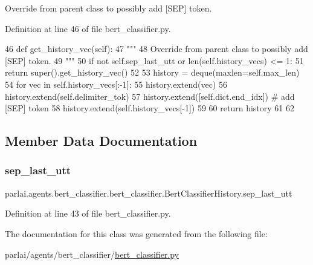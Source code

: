 \begin{DoxyVerb}Override from parent class to possibly add [SEP] token.
\end{DoxyVerb}
 

Definition at line 46 of file bert\+\_\+classifier.\+py.


\begin{DoxyCode}
46     \textcolor{keyword}{def }get\_history\_vec(self):
47         \textcolor{stringliteral}{"""}
48 \textcolor{stringliteral}{        Override from parent class to possibly add [SEP] token.}
49 \textcolor{stringliteral}{        """}
50         \textcolor{keywordflow}{if} \textcolor{keywordflow}{not} self.sep\_last\_utt \textcolor{keywordflow}{or} len(self.history\_vecs) <= 1:
51             \textcolor{keywordflow}{return} super().get\_history\_vec()
52 
53         history = deque(maxlen=self.max\_len)
54         \textcolor{keywordflow}{for} vec \textcolor{keywordflow}{in} self.history\_vecs[:-1]:
55             history.extend(vec)
56             history.extend(self.delimiter\_tok)
57         history.extend([self.dict.end\_idx])  \textcolor{comment}{# add [SEP] token}
58         history.extend(self.history\_vecs[-1])
59 
60         \textcolor{keywordflow}{return} history
61 
62 
\end{DoxyCode}


\subsection{Member Data Documentation}
\mbox{\label{classparlai_1_1agents_1_1bert__classifier_1_1bert__classifier_1_1BertClassifierHistory_ab53ecd52f1f23b1ea488637cc8fd8068}} 
\subsubsection{\texorpdfstring{sep\+\_\+last\+\_\+utt}{sep\_last\_utt}}
{\footnotesize\ttfamily parlai.\+agents.\+bert\+\_\+classifier.\+bert\+\_\+classifier.\+Bert\+Classifier\+History.\+sep\+\_\+last\+\_\+utt}



Definition at line 43 of file bert\+\_\+classifier.\+py.



The documentation for this class was generated from the following file\+:\begin{DoxyCompactItemize}
\item 
parlai/agents/bert\+\_\+classifier/\hyperlink{bert__classifier_8py}{bert\+\_\+classifier.\+py}\end{DoxyCompactItemize}
